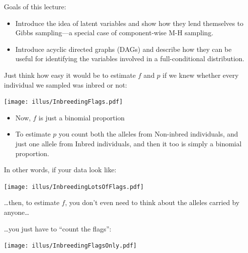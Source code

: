 








Goals of this lecture:
\begin{itemize}
\item Introduce the idea of latent variables and show how they lend themselves to Gibbs sampling---a special case of component-wise M-H sampling.
\item Introduce acyclic directed graphs (DAGs) and describe how they can be
useful for identifying the variables involved in a full-conditional distribution.
\end{itemize}



Just think how easy it would be to estimate $f$ and $p$ if we knew whether every individual we sampled was inbred or not:
\enlargethispage*{1000pt}
\begin{center}
\texttt{[image: illus/InbreedingFlags.pdf]}
\end{center}
\begin{itemize}
\item Now, $f$ is just a binomial proportion
\item To estimate $p$ you count both the alleles from Non-inbred individuals, and just one allele from Inbred individuals, and then it too is simply a binomial proportion.
\end{itemize}

\newpage

In other words, if your data look like:
\begin{center}
\texttt{[image: illus/InbreedingLotsOfFlags.pdf]}
\end{center}
\ldots then, to estimate $f$, you don't even need to think about the alleles carried by anyone\ldots

\newpage
\ldots you just have to ``count the flags'':
\begin{center}
\texttt{[image: illus/InbreedingFlagsOnly.pdf]}
\end{center}



